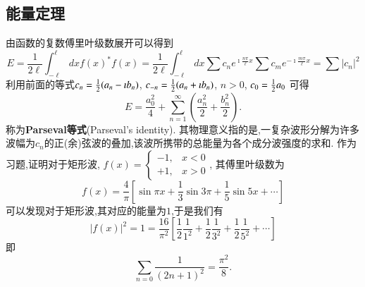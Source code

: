 \subsection{能量定理}
由函数的复数傅里叶级数展开可以得到
\begin{equation}
  E = \frac{1}{2\ell} \int_{-\ell}^{\ell} dx f(x)^* f(x) 
 = \frac{1}{2\ell} \int_{-\ell}^{\ell} dx  \sum c_n e^{\imath \frac{n\pi}{\ell} x} \sum c_m e^{-\imath \frac{m\pi}{\ell} x}
 = \sum |c_n|^2
\end{equation}
利用前面的等式$c_n = {\frac{1}{2}}(a_n - \imath b_n)$,  $c_{-n} = {\frac{1}{2}} (a_n + \imath b_n)$, $n>0$, $c_0 = {\frac{1}{2}} a_0$ 可得
\begin{equation}
  E = \frac{a_0^2}{4}+\sum_{n=1}^{\infty}\left(\frac{a_n^2}{2}+\frac{b_n^2}{2}\right) .
\end{equation}
称为\textbf{Parseval等式}(Parseval's identity).
其物理意义指的是,一复杂波形分解为许多波幅为$c_n$的正(余)弦波的叠加,该波所携带的总能量为各个成分波强度的求和.
作为习题,证明对于矩形波,
$f(x)=\left\{ \begin{array}{ll}-1, & x<0 \\ +1, &  x>0\end{array}\right.$, 其傅里叶级数为
$$
f(x)=\frac{4}{\pi} \left[  \sin \pi x+\frac{1}{3} \sin 3 \pi+\frac{1}{5 } \sin 5 x+\cdots \right]
$$
可以发现对于矩形波,其对应的能量为$1$,于是我们有
$$
|f(x)|^2=1=\frac{16}{\pi^2}\left[\frac{1}{2} \frac{1}{1^2}+\frac{1}{2} \frac{1}{3^2}+\frac{1}{2} \frac{1}{5^2}+\cdots\right]
$$
即
$$
\sum_{n=0} \frac{1}{(2n+1)^2} = \frac{\pi^2}{8} .
$$